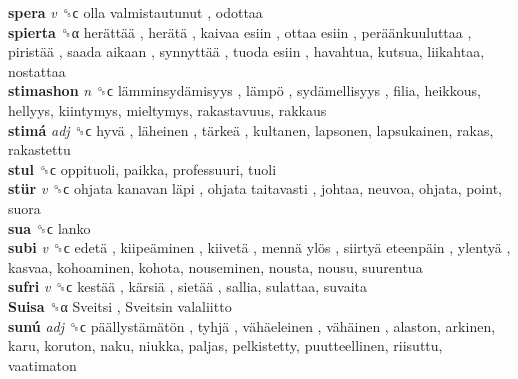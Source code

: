 \textbf{spera} \emph{v}  ␝ϲ   olla valmistautunut , odottaa  \\
\textbf{spierta} ␝α   herättää ,  herätä ,  kaivaa esiin ,  ottaa esiin ,  peräänkuuluttaa ,  piristää ,  saada aikaan ,  synnyttää ,  tuoda esiin , havahtua, kutsua, liikahtaa, nostattaa  \\
\textbf{stimashon} \emph{n}  ␝ϲ   lämminsydämisyys ,  lämpö ,  sydämellisyys , filia, heikkous, hellyys, kiintymys, mieltymys, rakastavuus, rakkaus  \\
\textbf{stimá} \emph{adj}  ␝ϲ   hyvä ,  läheinen ,  tärkeä , kultanen, lapsonen, lapsukainen, rakas, rakastettu  \\
\textbf{stul} ␝ϲ  oppituoli, paikka, professuuri, tuoli  \\
\textbf{stür} \emph{v}  ␝ϲ   ohjata kanavan läpi ,  ohjata taitavasti , johtaa, neuvoa, ohjata, point, suora  \\
\textbf{sua} ␝ϲ  lanko  \\
\textbf{subi} \emph{v}  ␝ϲ   edetä ,  kiipeäminen ,  kiivetä ,  mennä ylös ,  siirtyä eteenpäin ,  ylentyä , kasvaa, kohoaminen, kohota, nouseminen, nousta, nousu, suurentua  \\
\textbf{sufri} \emph{v}  ␝ϲ   kestää ,  kärsiä ,  sietää , sallia, sulattaa, suvaita  \\
\textbf{Suisa} ␝α   Sveitsi ,  Sveitsin valaliitto   \\
\textbf{sunú} \emph{adj}  ␝ϲ   päällystämätön ,  tyhjä ,  vähäeleinen ,  vähäinen , alaston, arkinen, karu, koruton, naku, niukka, paljas, pelkistetty, puutteellinen, riisuttu, vaatimaton  \\
